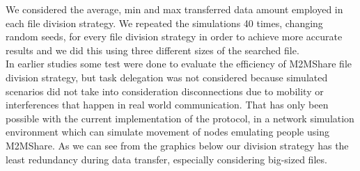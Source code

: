 We considered the average, min and max transferred data amount employed in each file division strategy. We repeated the simulations 40 times, changing random seeds, for every file division strategy in order to achieve more accurate results and we did this using three different sizes of the searched file. 
\\
In earlier studies some test were done to evaluate the efficiency of M2MShare file division strategy, but task delegation was not considered because simulated scenarios did not take into consideration disconnections due to mobility or interferences that happen in real world
communication. That has only been possible with the current implementation of the protocol, in a network simulation environment which can simulate movement of nodes emulating people using M2MShare.
As we can see from the graphics below our division strategy has the least redundancy during data transfer, especially considering big-sized files.

